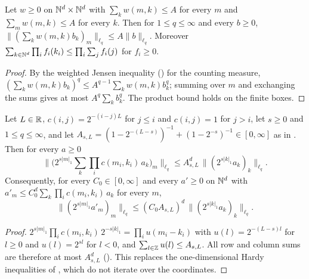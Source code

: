 \begin{lemma}
\label{lem:schur-test}
\leanok
{}
Let $w \geq 0$ on $\mathbb{N}^d \times \mathbb{N}^d$ with $\sum_k w(m, k) \leq A$ for every $m$ and
$\sum_m w(m, k) \leq A$ for every $k$. Then for $1 \leq q \leq \infty$ and every $b \geq 0$,
$\|(\sum_k w(m, k) b_k)_m\|_{\ell_q} \leq A \|b\|_{\ell_q}$. Moreover
$\sum_{k \in \mathbb{N}^d} \prod_i f_i(k_i) \leq \prod_i \sum_j f_i(j)$ for $f_i \geq 0$.
\end{lemma}

\begin{proof}
\leanok
By the weighted Jensen inequality () for the counting measure,
$(\sum_k w(m, k) b_k)^q \leq A^{q-1} \sum_k w(m, k) b_k^q$; summing over $m$ and exchanging the sums
gives at most $A^q \sum_k b_k^q$. The product bound holds on the finite boxes.
\end{proof}

\begin{lemma}
\label{lem:mixed-almost-diagonal}
\leanok
{}
Let $L \in \mathbb{R}$, $c(i, j) = 2^{-(i - j)L}$ for $j \leq i$ and $c(i, j) = 1$ for $j > i$, let
$s \geq 0$ and $1 \leq q \leq \infty$, and let
$A_{s,L} = (1 - 2^{-(L-s)})^{-1} + (1 - 2^{-s})^{-1} \in [0, \infty]$ as in
. Then for every $a \geq 0$
\[
  \bigl\|\bigl(2^{s|m|_1} \textstyle\sum_k \prod_i c(m_i, k_i) \, a_k\bigr)_m\bigr\|_{\ell_q}
  \leq A_{s,L}^d \, \|(2^{s|k|_1} a_k)_k\|_{\ell_q} .
\]
Consequently, for every $C_0 \in [0, \infty]$ and every $a' \geq 0$ on $\mathbb{N}^d$ with
$a'_m \leq C_0^d \sum_k \prod_i c(m_i, k_i) \, a_k$ for every $m$,
\[
  \|(2^{s|m|_1} a'_m)_m\|_{\ell_q} \leq (C_0 A_{s,L})^d \, \|(2^{s|k|_1} a_k)_k\|_{\ell_q} .
\]
\end{lemma}

\begin{proof}
\leanok
$2^{s|m|_1} \prod_i c(m_i, k_i) \, 2^{-s|k|_1} = \prod_i u(m_i - k_i)$ with $u(l) = 2^{-(L-s)l}$
for $l \geq 0$ and $u(l) = 2^{sl}$ for $l < 0$, and $\sum_{l \in \mathbb{Z}} u(l) \leq A_{s,L}$. All row
and column sums are therefore at most $A_{s,L}^d$ (). This replaces the
one-dimensional Hardy inequalities of , which do not iterate over the
coordinates.
\end{proof}

